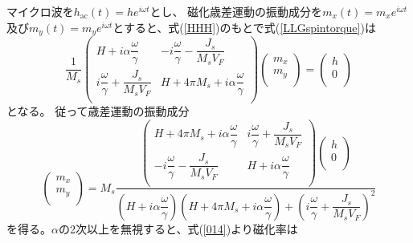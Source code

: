 マイクロ波を$h_\text{ac}(t)=h e^{i\omega t}$とし、
磁化歳差運動の振動成分を$m_{x}(t)=m_{x} e^{i\omega t}$及び$m_{y}(t)=m_{y} e^{i\omega t}$とすると、式(\ref{HHH})のもとで式(\ref{LLGspintorque})は
\begin{equation}
\frac{1}{{{M_s}}}\left( {\begin{array}{*{20}{c}}
   {H + i\alpha \dfrac{\omega }{\gamma }} & { - i\dfrac{\omega }{\gamma } - \dfrac{{{J_s}}}{{{M_s}{V_F}}}}  \\
   {i\dfrac{\omega }{\gamma } + \dfrac{{{J_s}}}{{{M_s}{V_F}}}} & {H + 4\pi {M_s} + i\alpha \dfrac{\omega }{\gamma }}  \\
\end{array}} \right)\left( {\begin{array}{*{20}{c}}
   {{m_x}}  \\
   {{m_y}}  \\
\end{array}} \right) = \left( {\begin{array}{*{20}{c}}
   h  \\
   0  \\
\end{array}} \right)
\end{equation}
となる。
従って歳差運動の振動成分
\begin{equation}
\left( {\begin{array}{*{20}{c}}
   {{m_x}}  \\
   {{m_y}}  \\
\end{array}} \right) = {M_s}\frac{{\left( {\begin{array}{*{20}{c}}
   {H + 4\pi {M_s} + i\alpha \dfrac{\omega }{\gamma }} & {i\dfrac{\omega }{\gamma } + \dfrac{{{J_s}}}{{{M_s}{V_F}}}}  \\
   { - i\dfrac{\omega }{\gamma } - \dfrac{{{J_s}}}{{{M_s}{V_F}}}} & {H + i\alpha \dfrac{\omega }{\gamma }}  \\
\end{array}} \right)\left( {\begin{array}{*{20}{c}}
   h  \\
   0  \\
\end{array}} \right)}}{{\left( {H + i\alpha \dfrac{\omega }{\gamma }} \right)\left( {H + 4\pi {M_s} + i\alpha \dfrac{\omega }{\gamma }} \right) + {{\left( {i\dfrac{\omega }{\gamma } + \dfrac{{{J_s}}}{{{M_s}{V_F}}}} \right)}^2}}}\label{014}
\end{equation}
を得る。$\alpha$の2次以上を無視すると、式(\ref{014})より磁化率は
